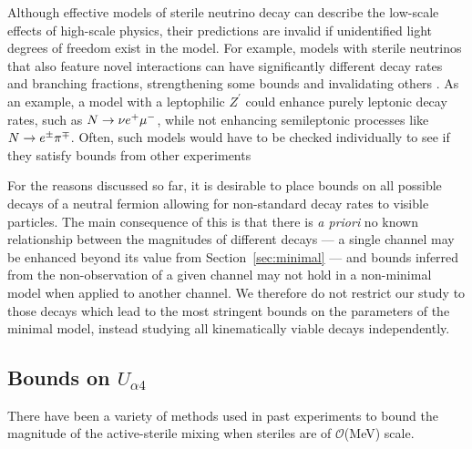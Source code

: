 \documentclass[11pt, a4paper]{article}
\newcommand{\refsec}[1]{Section~\ref{#1}}
\def\ster{\ensuremath N}
\begin{document}
Although effective models of sterile neutrino decay can describe the low-scale
effects of high-scale physics, their predictions are invalid if unidentified
light degrees of freedom exist in the model. For example, models with sterile
neutrinos that also feature novel interactions can have significantly different
decay rates and branching fractions, strengthening some bounds and invalidating
others \cite{Batell:2016zod,Ballett:2016xxx}.
%
As an example, a model with a leptophilic $Z^\prime$ \cite{Foot:1994vd} could
enhance purely leptonic decay rates, such as $\ster\to \nu e^+\mu^-$, while not
enhancing semileptonic processes like $\ster\to e^\pm \pi^\mp$.
%
Often, such models would have to be checked individually to see if they satisfy
bounds from other experiments

For the reasons discussed so far, it is desirable to place bounds on all
possible decays of a neutral fermion allowing for non-standard decay rates to
visible particles. The main consequence of this is that there is \emph{a
priori} no known relationship between the magnitudes of different decays --- a
single channel may be enhanced beyond its value from \refsec{sec:minimal} ---
and bounds inferred from the non-observation of a given channel may not hold in
a non-minimal model when applied to another channel. We therefore do not
restrict our study to those decays which lead to the most stringent bounds on
the parameters of the minimal model, instead studying all kinematically viable
decays independently.

\subsection{\label{sec:bounds}Bounds on $U_{\alpha 4}$}

There have been a variety of methods used in past experiments to bound the
magnitude of the active-sterile mixing when steriles are of $\mathcal{O}$(MeV)
scale. 
\end{document}
